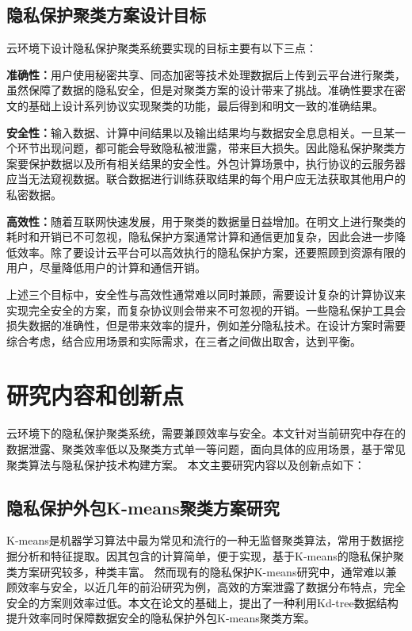 \subsection{隐私保护聚类方案设计目标}
云环境下设计隐私保护聚类系统要实现的目标主要有以下三点：
\begin{compactitem}
	\item \textbf{准确性：}用户使用秘密共享、同态加密等技术处理数据后上传到云平台进行聚类，虽然保障了数据的隐私安全，但是对聚类方案的设计带来了挑战。准确性要求在密文的基础上设计系列协议实现聚类的功能，最后得到和明文一致的准确结果。
	\item \textbf{安全性：}输入数据、计算中间结果以及输出结果均与数据安全息息相关。一旦某一个环节出现问题，都可能会导致隐私被泄露，带来巨大损失。因此隐私保护聚类方案要保护数据以及所有相关结果的安全性。外包计算场景中，执行协议的云服务器应当无法窥视数据。联合数据进行训练获取结果的每个用户应无法获取其他用户的私密数据。
	\item \textbf{高效性：}随着互联网快速发展，用于聚类的数据量日益增加。在明文上进行聚类的耗时和开销已不可忽视，隐私保护方案通常计算和通信更加复杂，因此会进一步降低效率。除了要设计云平台可以高效执行的隐私保护方案，还要照顾到资源有限的用户，尽量降低用户的计算和通信开销。
\end{compactitem}

上述三个目标中，安全性与高效性通常难以同时兼顾，需要设计复杂的计算协议来实现完全安全的方案，而复杂协议则会带来不可忽视的开销。一些隐私保护工具会损失数据的准确性，但是带来效率的提升，例如差分隐私技术。在设计方案时需要综合考虑，结合应用场景和实际需求，在三者之间做出取舍，达到平衡。
\section{研究内容和创新点}
云环境下的隐私保护聚类系统，需要兼顾效率与安全。本文针对当前研究中存在的数据泄露、聚类效率低以及聚类方式单一等问题，面向具体的应用场景，基于常见聚类算法与隐私保护技术构建方案。
本文主要研究内容以及创新点如下：
\subsection{隐私保护外包K-means聚类方案研究}
K-means是机器学习算法中最为常见和流行的一种无监督聚类算法，常用于数据挖掘分析和特征提取。因其包含的计算简单，便于实现，基于K-means的隐私保护聚类方案研究较多，种类丰富。
然而现有的隐私保护K-means研究中，通常难以兼顾效率与安全，以近几年的前沿研究为例，高效的方案泄露了数据分布特点\cite{wu2020secure}，完全安全的方案则效率过低\cite{jaschke2019unsupervised}。本文在论文\cite{kanungo2002efficient}的基础上，提出了一种利用Kd-tree数据结构提升效率同时保障数据安全的隐私保护外包K-means聚类方案。

